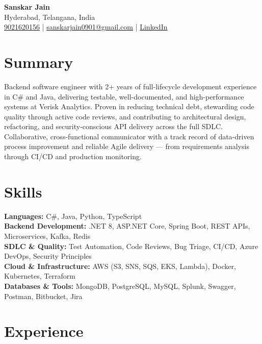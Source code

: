 \documentclass[letterpaper,10pt]{article}
\begin{document}
\begin{center}
    {\LARGE \textbf{Sanskar Jain}} \\
    Hyderabad, Telangana, India \\
    \href{tel:9021620156}{9021620156} \;|\;
    \href{mailto:sanskarjain0901@gmail.com}{sanskarjain0901@gmail.com} \;|\;
    \href{https://www.linkedin.com/in/sanskar-jain0901/}{LinkedIn}
\end{center}

\vspace{3pt}

\section*{Summary}
Backend software engineer with 2+ years of full-lifecycle development experience in C\# and Java, delivering testable, well-documented, and high-performance systems at Verisk Analytics.
Proven in reducing technical debt, stewarding code quality through active code reviews, and contributing to architectural design, refactoring, and security-conscious API delivery across the full SDLC.
Collaborative, cross-functional communicator with a track record of data-driven process improvement and reliable Agile delivery — from requirements analysis through CI/CD and production monitoring.

\section*{Skills}
\textbf{Languages:} C\#, Java, Python, TypeScript \\
\textbf{Backend Development:} .NET 8, ASP.NET Core, Spring Boot, REST APIs, Microservices, Kafka, Redis \\
\textbf{SDLC \& Quality:} Test Automation, Code Reviews, Bug Triage, CI/CD, Azure DevOps, Security Principles \\
\textbf{Cloud \& Infrastructure:} AWS (S3, SNS, SQS, EKS, Lambda), Docker, Kubernetes, Terraform \\
\textbf{Databases \& Tools:} MongoDB, PostgreSQL, MySQL, Splunk, Swagger, Postman, Bitbucket, Jira

\section*{Experience}
\end{document}

